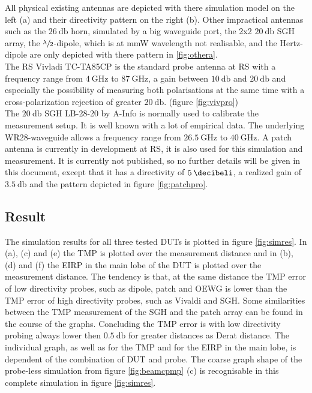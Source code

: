 All physical existing antennas are depicted with there simulation model on the left (a) and their directivity pattern on the right (b). Other impractical antennas such as the $\SI{26}{\decibel}$ horn, simulated by a big waveguide port, the 2x2 $\SI{20}{\decibel}$ \ac{SGH} array, the $\sfrac{\lambda}{2}$-dipole, which is at \ac{mmW} wavelength not realisable, and the Hertz-dipole are only depicted with there pattern in \ref{fig:othera}.\\
The \ac{RS} Vivladi TC-TA85CP is the standard probe antenna at \ac{RS} with a frequency range from $\SI{4}{\giga\hertz}$ to $\SI{87}{\giga\hertz}$, a gain between $\SI{10}{\decibel}$ and $\SI{20}{\decibel}$ and especially the possibility of measuring both polarisations at the same time with a cross-polarization rejection of greater $\SI{20}{\decibel}$. (figure \ref{fig:vivpro})\\
The $\SI{20}{\decibel}$ \ac{SGH} LB-28-20 by A-Info is normally used to calibrate the measurement setup. It is well known with a lot of empirical data. The underlying WR28-waveguide allows a frequency range from $\SI{26.5}{\giga\hertz}$ to $\SI{40}{\giga\hertz}$. A patch antenna is currently in development at \ac{RS}, it is also used for this simulation and measurement. It is currently not published, so  no further details will be given in this document, except that it has a directivity of $\SI{5}{\decibeli}$, a realized gain of $\SI{3.5}{\decibel}$ and the pattern depicted in figure \ref{fig:patchpro}. 

\subsection{Result}

The simulation results for all three tested \acp{DUT} is plotted in figure \ref{fig:simres}. In (a), (c) and (e) the \ac{TMP} is plotted over the measurement distance and in (b), (d) and (f) the \ac{EIRP} in the main lobe of the \ac{DUT} is plotted over the measurement distance. The tendency is that, at the same distance the \ac{TMP} error of low directivity probes, such as dipole, patch and \ac{OEWG} is lower than the \ac{TMP} error of high directivity probes, such as Vivaldi and \ac{SGH}. Some similarities between the \ac{TMP} measurement of the \ac{SGH} and the patch array can be found in the course of the graphs. Concluding the \ac{TMP} error is with low directivity probing always lower then $\SI{0.5}{\decibel}$ for greater distances as Derat distance. The individual graph, as well as for the \ac{TMP} and for the \ac{EIRP} in the main lobe, is dependent of the combination of \ac{DUT} and probe. The coarse graph shape of the probe-less simulation from figure \ref{fig:beamcpmp} (c) is recognisable in this complete simulation in figure \ref{fig:simres}.

